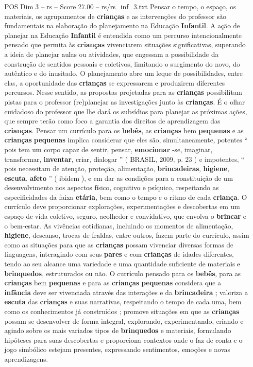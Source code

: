 \begin{textsample}{POS Dim 3 – rs – Score 27.00 – rs/rs\_inf\_3.txt}
Pensar o tempo, o espaço, os materiais, os agrupamentos de \textbf{crianças} e as intervenções do professor são fundamentais na elaboração do planejamento na Educação \textbf{Infantil}.
A ação de planejar na Educação \textbf{Infantil} é entendida como um percurso intencionalmente pensado que permita às \textbf{crianças} vivenciarem situações significativas, superando a ideia de planejar aulas ou atividades, que engessam a possibilidade da construção de sentidos pessoais e coletivos, limitando o surgimento do novo, do autêntico e do inusitado.
O planejamento abre um leque de possibilidades, entre elas, a oportunidade das \textbf{crianças} se expressarem e produzirem diferentes percursos.
Nesse sentido, as propostas projetadas para as \textbf{crianças} possibilitam pistas para o professor (re)planejar as investigações junto às \textbf{crianças}.
É o olhar cuidadoso do professor que lhe dará os subsídios para planejar as próximas ações, que sempre terão como foco a garantia dos direitos de aprendizagem das \textbf{crianças}.
Pensar um currículo para os \textbf{bebês}, as \textbf{crianças} bem \textbf{pequenas} e as \textbf{crianças} \textbf{pequenas} implica considerar que eles são, simultaneamente, potentes “ pois tem um corpo capaz de sentir, pensar, \textbf{emocionar} -se, imaginar, transformar, \textbf{inventar}, criar, dialogar ” ( BRASIL, 2009, p. 23 ) e impotentes, “ pois necessitam de atenção, proteção, alimentação, \textbf{brincadeiras}, \textbf{higiene}, \textbf{escuta}, \textbf{afeto} ” ( ibidem ), e em dar as condições para a constituição de um desenvolvimento nos aspectos físico, cognitivo e psíquico, respeitando as especificidades da faixa \textbf{etária}, bem como o tempo e o ritmo de cada \textbf{criança}.
O currículo deve proporcionar explorações, experimentações e descobertas em um espaço de vida coletivo, seguro, acolhedor e convidativo, que envolva o \textbf{brincar} e o bem-estar.
As vivências cotidianas, incluindo os momentos de alimentação, \textbf{higiene}, descanso, trocas de fraldas, entre outros, fazem parte do currículo, assim como as situações para que as \textbf{crianças} possam vivenciar diversas formas de linguagens, interagindo com seus \textbf{pares} e com \textbf{crianças} de idades diferentes, tendo ao seu alcance uma variedade e uma quantidade suficiente de materiais e \textbf{brinquedos}, estruturados ou não.
O currículo pensado para os \textbf{bebês}, para as \textbf{crianças} bem \textbf{pequenas} e para as \textbf{crianças} \textbf{pequenas} considera que a \textbf{infância} deve ser vivenciada através das interações e da \textbf{brincadeira} ; valoriza a \textbf{escuta} das \textbf{crianças} e suas narrativas, respeitando o tempo de cada uma, bem como os conhecimentos já construídos ; promove situações em que as \textbf{crianças} possam se desenvolver de forma integral, explorando, experimentando, criando e agindo sobre os mais variados tipos de \textbf{brinquedos} e materiais, formulando hipóteses para suas descobertas e proporciona contextos onde o faz-de-conta e o jogo simbólico estejam presentes, expressando sentimentos, emoções e novas aprendizagens.

\end{textsample}
